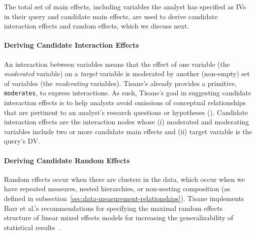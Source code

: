 The total set of main effects, including variables the analyst has specified as
IVs in their query and candidate main effects, are used to derive candidate interaction
effects and random effects, which we discuss next.

\paragraph{Deriving Candidate Interaction Effects}
An interaction between variables means that the effect of one variable (the \textit{moderated} variable) on a \textit{target} variable is moderated by another (non-empty) set of variables (the \textit{moderating} variables). Tisane's
\SDSL already provides a primitive, \texttt{moderates}, to
express interactions. As such, Tisane's goal in suggesting candidate interaction
effects is to help analysts avoid omissions of conceptual relationships
that are pertinent to an analyst's research questions or hypotheses (\dcConceptualKnowledge).
Candidate interaction effects are the interaction nodes whose (i) moderated and moderating variables include two or more candidate main effects and (ii)
    target variable is the query's DV.

\paragraph{Deriving Candidate Random Effects} \label{sec:deriveRandomEffects}
Random effects occur when there are clusters in the data, which occur when
we have repeated measures,
nested hierarchies, or non-nesting composition (as defined in subsection~\ref{sec:data-measurement-relationships}). Tisane implements Barr et al.'s recommendations
for specifying the maximal random effects structure of linear mixed effects
models for increasing the generalizability of statistical
results~\cite{barr2013random, barr2013randomUpdated}.

